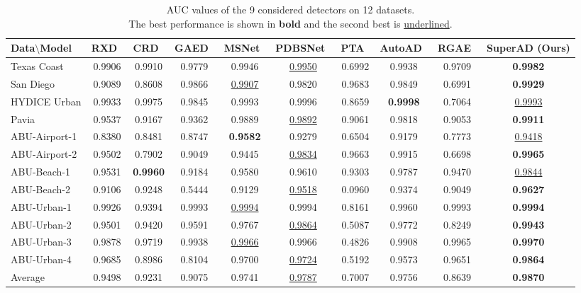 \begin{table}[htbp]
  \centering
  \caption{AUC values of the 9 considered detectors on 12 datasets. \\ The best performance is shown in \textbf{bold} and the second best is \underline{underlined}.}
  \begin{tabular}{lccccccccc}
    \toprule
    Data$\setminus$Model & RXD~\cite{RXD} & CRD~\cite{CRD} & GAED~\cite{GAED} & MSNet~\cite{MSNet} & PDBSNet~\cite{PDBSNet} & PTA~\cite{PTA} & AutoAD~\cite{AutoAD} & RGAE~\cite{RGAE} & SuperAD (Ours) \bigstrut \\
    \hline
    Texas Coast & 0.9906 & 0.9910 & 0.9779 & 0.9946 & \underline{0.9950} & 0.6992 & 0.9938 & 0.9709 & \textbf{0.9982} \bigstrut[t] \\
    San Diego & 0.9089 & 0.8608 & 0.9866 & \underline{0.9907} & 0.9820 & 0.9683 & 0.9849 & 0.6991 & \textbf{0.9929} \bigstrut[t] \\
    HYDICE Urban & 0.9933 & 0.9975 & 0.9845 & 0.9993 & 0.9996 & 0.8659 & \textbf{0.9998} & 0.7064 & \underline{0.9993} \bigstrut[t] \\
    Pavia & 0.9537 & 0.9167 & 0.9362 & 0.9889 & \underline{0.9892} & 0.9061 & 0.9818 & 0.9053 & \textbf{0.9911} \bigstrut[t] \\
    ABU-Airport-1 & 0.8380 & 0.8481 & 0.8747 & \textbf{0.9582} & 0.9279 & 0.6504 & 0.9179 & 0.7773 & \underline{0.9418} \bigstrut[t] \\
    ABU-Airport-2 & 0.9502 & 0.7902 & 0.9049 & 0.9445 & \underline{0.9834} & 0.9663 & 0.9915 & 0.6698 & \textbf{0.9965} \bigstrut[t] \\
    ABU-Beach-1 & 0.9531 & \textbf{0.9960} & 0.9184 & 0.9580 & 0.9610 & 0.9303 & 0.9787 & 0.9470 & \underline{0.9844} \bigstrut[t] \\
    ABU-Beach-2 & 0.9106 & 0.9248 & 0.5444 & 0.9129 & \underline{0.9518} & 0.0960 & 0.9374 & 0.9049 & \textbf{0.9627} \bigstrut[t] \\
    ABU-Urban-1 & 0.9926 & 0.9394 & 0.9993 & \underline{0.9994} & 0.9994 & 0.8161 & 0.9960 & 0.9993 & \textbf{0.9994} \bigstrut[t] \\
    ABU-Urban-2 & 0.9501 & 0.9420 & 0.9591 & 0.9767 & \underline{0.9864} & 0.5087 & 0.9772 & 0.8249 & \textbf{0.9943} \bigstrut[t] \\
    ABU-Urban-3 & 0.9878 & 0.9719 & 0.9938 & \underline{0.9966} & 0.9966 & 0.4826 & 0.9908 & 0.9965 & \textbf{0.9970} \bigstrut[t] \\
    ABU-Urban-4 & 0.9685 & 0.8986 & 0.8104 & 0.9700 & \underline{0.9724} & 0.5192 & 0.9573 & 0.9651 & \textbf{0.9864} \bigstrut[t] \\
    \midrule
    Average & 0.9498 & 0.9231 & 0.9075 & 0.9741 & \underline{0.9787} & 0.7007 & 0.9756 & 0.8639 & \textbf{0.9870} \bigstrut[t] \\
    \bottomrule
  \end{tabular}%
  \label{tab:cmp-all-models}%
\end{table}


